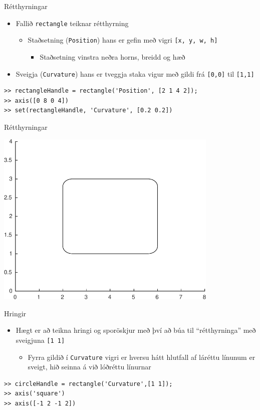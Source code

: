 \documentclass[handout]{beamer}
\begin{document}
\begin{frame}[fragile]{Rétthyrningar}
\begin{itemize}
 \item Fallið \texttt{rectangle} teiknar rétthyrning
 \begin{itemize}
  \item Staðsetning (\texttt{Position}) hans er gefin með vigri \texttt{[x, y, w, h]}
  \begin{itemize}
   \item Staðsetning vinstra neðra horns, breidd og hæð
  \end{itemize}
 \end{itemize}
 \item Sveigja (\texttt{Curvature}) hans er tveggja staka vigur með gildi frá \texttt{[0,0]} til \texttt{[1,1]}
\end{itemize}
\begin{verbatim}
>> rectangleHandle = rectangle('Position', [2 1 4 2]);
>> axis([0 8 0 4])
>> set(rectangleHandle, 'Curvature', [0.2 0.2])
\end{verbatim}

\end{frame}

\begin{frame}{Rétthyrningar}
\begin{center}
\includegraphics[width=0.8\textwidth]{Pics/rectangle-example}
\end{center}
\end{frame}

\begin{frame}[fragile]{Hringir}
\pause
\begin{itemize}
 \item Hægt er að teikna hringi og sporöskjur með því að búa til ``rétthyrninga'' með sveigjuna \texttt{[1 1]}
 \begin{itemize}
  \item Fyrra gildið í \texttt{Curvature} vigri er hversu hátt hlutfall af láréttu línunum er sveigt, hið seinna á við lóðréttu línurnar
 \end{itemize}
\end{itemize}
\begin{verbatim}
>> circleHandle = rectangle('Curvature',[1 1]);
>> axis('square')
>> axis([-1 2 -1 2])
\end{verbatim}
\end{frame}
\end{document}
